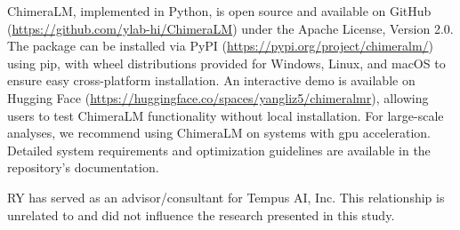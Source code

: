 \documentclass[pdflatex,sn-nature]{sn-jnl}%
\theoremstyle{thmstyleone}%
\theoremstyle{thmstyletwo}%
\theoremstyle{thmstylethree}%
\begin{document}


ChimeraLM, implemented in Python, is open source and available on GitHub (\url{https://github.com/ylab-hi/ChimeraLM}) under the Apache License, Version 2.0.
The package can be installed via PyPI (\url{https://pypi.org/project/chimeralm/}) using pip, with wheel distributions provided for Windows, Linux, and macOS to ensure easy cross-platform installation.
An interactive demo is available on Hugging Face (\url{https://huggingface.co/spaces/yangliz5/chimeralmr}), allowing users to test ChimeraLM functionality without local installation.
For large-scale analyses, we recommend using ChimeraLM on systems with \gls{gpu} acceleration. Detailed system requirements and optimization guidelines are available in the repository's documentation.


RY has served as an advisor/consultant for Tempus AI, Inc. This relationship is unrelated to and did not influence the research presented in this study.


%
\end{document}
